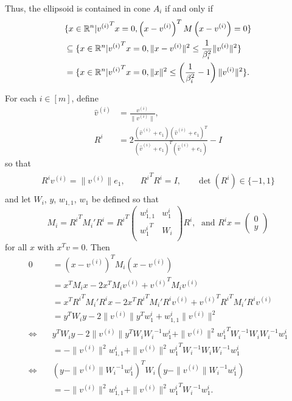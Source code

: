 Thus, the ellipsoid is contained in cone $A_i$ if and only if
\begin{align*}
&\{x \in \mathbb R^n | {v^{(i)}}^Tx = 0, \left(x - v^{(i)}\right)^TM\left(x - v^{(i)}\right) = 0\} \\
&\subseteq \{x \in \mathbb R^n | {v^{(i)}}^Tx = 0, \|x - v^{(i)}\|^2 \le \frac 1 {\beta_i^2}\|v^{(i)}\|^2 \} \\
&= \{x \in \mathbb R^n | {v^{(i)}}^Tx = 0, \|x\|^2 \le \left(\frac 1 {\beta_i^2} - 1\right)\|v^{(i)}\|^2 \}.
\end{align*}

For each $i \in [m]$, define
\begin{align*}
\hat v^{(i)} & = \frac{v^{(i)}}{\|v^{(i)}\|}, \\
R^i & = 2\frac{(\hat v^{(i)} + e_1)(\hat v^{(i)} + e_1)^T}{(\hat v^{(i)} + e_1)^T(\hat v^{(i)} + e_1)} - I
\end{align*}
so that
\begin{align*}
\begin{array}{ccc}
{R^i}v^{(i)} = \|v^{(i)}\|e_1, & \quad {R^i}^T{R^i} = I, & \quad \det({R^i}) \in \{-1, 1\}
\end{array}
\end{align*}
and let $W_i$, $y$, $w_{1,1}$, $w_1$ be defined so that
\[
M_i = {R^i}^T M_i' {R^i} = {R^i}^T\left( \begin{array}{cc}
{w_{1,1}^i} & {w_1^i} \\
{w_1^i}^T	& {W_i}  \\
\end{array} \right){R^i},  \; \text{ and }
{R^i}x = \left(\begin{array}{c}
0 \\
y
\end{array}\right)
\]
for all $x$ with $x^Tv = 0$.
Then
\begin{align*}
0 &= \left(x - {v^{(i)}}\right)^TM_i\left(x - {v^{(i)}}\right) \\
&= x^TM_ix - 2x^TM_i{v^{(i)}} + {v^{(i)}}^TM_i{v^{(i)}} \\
&= x^T{R^i}^TM_i'{R^i}x - 2x^T{R^i}^TM_i'{R^i}{v^{(i)}} + {v^{(i)}}^T{R^i}^TM_i'{R^i}{v^{(i)}} \\
&= y^T{W_i}y - 2\|v^{(i)}\|y^Tw_1^i + {w_{1,1}^i}\|v^{(i)}\|^2 \\
\Longleftrightarrow \quad & y^T{W_i}y - 2\|v^{(i)}\|y^T{W_i}{W_i}^{-1}{w_1^i} + \|v^{(i)}\|^2{{w_1^i}}^T{W_i}^{-1}{W_i}{W_i}^{-1}{w_1^i} \\
&= - \|v^{(i)}\|^2{w_{1,1}^i} + \|v^{(i)}\|^2{{w_1^i}}^T{W_i}^{-1}{W_i}{W_i}^{-1}{w_1^i} \\
\Longleftrightarrow \quad & \left(y - \|v^{(i)}\|{W_i}^{-1}{w_1^i}\right)^T{W_i}\left(y - \|v^{(i)}\|{W_i}^{-1}{w_1^i}\right) \\
&= - \|v^{(i)}\|^2{w_{1,1}^i} + \|v^{(i)}\|^2{{{w_1^i}}}^T{W_i}^{-1}{{w_1^i}}. 
\end{align*}

